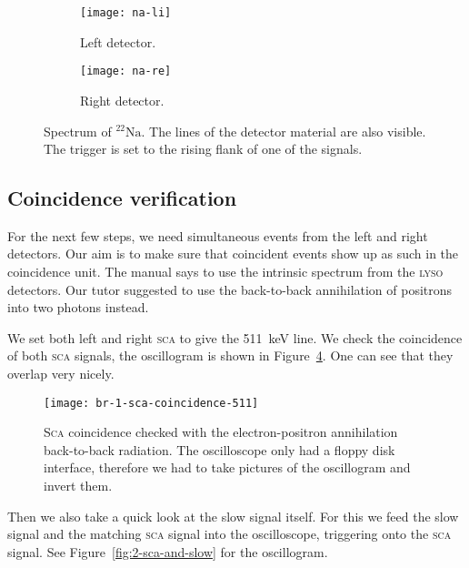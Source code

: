 \documentclass[11pt, english, fleqn, DIV=15, headinclude, BCOR=2cm]{scrreprt}
\begin{document}
\begin{figure}
        \centering
        \begin{subfigure}[c]{.49\linewidth}
                \centering
                \texttt{[image: na-li]}
                \caption{%
                        Left detector.
                }
                \label{fig:na-li}
        \end{subfigure}
        \hfill
        \begin{subfigure}[c]{.49\linewidth}
                \centering
                \texttt{[image: na-re]}
                \caption{%
                        Right detector.
                }
                \label{fig:na-re}
        \end{subfigure}
        \caption{%
                Spectrum of ${}^{22}\text{Na}$. The lines of the detector
                material are also visible. The trigger is set to the rising
                flank of one of the signals.
        }
        \label{fig:natrium}
\end{figure}

\subsection{Coincidence verification}

For the next few steps, we need simultaneous events from the left and right
detectors. Our aim is to make sure that coincident events show up as such in
the coincidence unit. The manual says to use the intrinsic spectrum from the
\textsc{lyso} detectors. Our tutor suggested to use the back-to-back
annihilation of positrons into two photons instead.

We set both left and right \textsc{sca} to give the
\SI{511}{\kilo\electronvolt} line. We check the coincidence of both
\textsc{sca} signals, the oscillogram is shown in
Figure~\ref{fig:1-sca-coincidence-511}. One can see that they overlap very
nicely.

\begin{figure}
    \centering
    \texttt{[image: br-1-sca-coincidence-511]}
    \caption{%
        \textsc{Sca} coincidence checked with the electron-positron
        annihilation back-to-back radiation. The oscilloscope only had a floppy
        disk interface, therefore we had to take pictures of the oscillogram
        and invert them.
    }
    \label{fig:1-sca-coincidence-511}
\end{figure}

Then we also take a quick look at the slow signal itself. For this we feed the
slow signal and the matching \textsc{sca} signal into the oscilloscope,
triggering onto the \textsc{sca} signal. See Figure~\ref{fig:2-sca-and-slow}
for the oscillogram.
\end{document}
